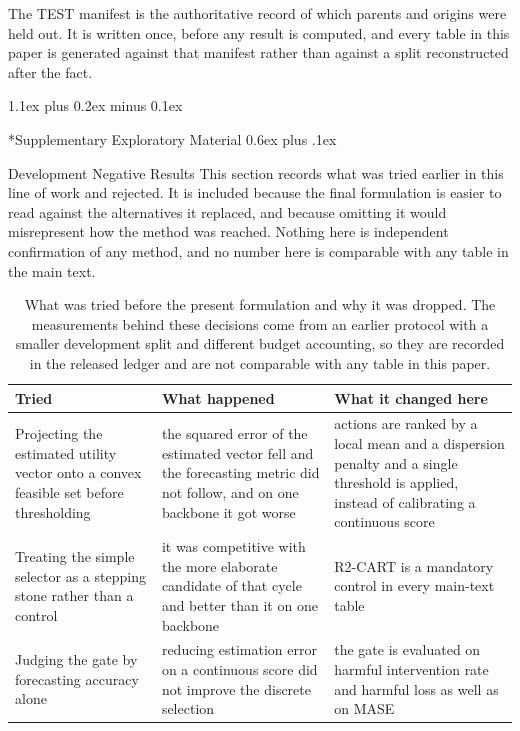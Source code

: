 \documentclass{article}
\makeatletter
\def\section{\@startsection{section}{1}{\z@}{-1.6ex plus -0.5ex minus -.2ex}%
  {1.1ex plus 0.2ex minus 0.1ex}{\large\sc\raggedright}}
\def\subsection{\@startsection{subsection}{2}{\z@}{-1.4ex plus -0.4ex minus -.2ex}%
  {0.6ex plus .1ex}{\normalsize\sc\raggedright}}
\makeatother
\begin{document}
The TEST manifest is the authoritative record of which parents and origins were held out. It
is written once, before any result is computed, and every table in this paper is generated
against that manifest rather than against a split reconstructed after the fact.

\section*{Supplementary Exploratory Material}
\label{app:supplementary}
\subsection{Development Negative Results}
\label{app:development}
This section records what was tried earlier in this line of work and rejected. It is included
because the final formulation is easier to read against the alternatives it replaced, and
because omitting it would misrepresent how the method was reached. Nothing here is independent
confirmation of any method, and no number here is comparable with any table in the main text.

\begin{table}[h]
  \caption{What was tried before the present formulation and why it was dropped. The
  measurements behind these decisions come from an earlier protocol with a smaller development
  split and different budget accounting, so they are recorded in the released ledger and are
  not comparable with any table in this paper.}
  \label{tab:app-development}
  \centering
  \small
  \setlength{\tabcolsep}{4pt}
\begin{tabular}{@{}p{} p{} p{}@{}}
    \toprule
    Tried & What happened & What it changed here \\
    \midrule
    Projecting the estimated utility vector onto a convex feasible set before thresholding & the squared error of the estimated vector fell and the forecasting metric did not follow, and on one backbone it got worse & actions are ranked by a local mean and a dispersion penalty and a single threshold is applied, instead of calibrating a continuous score \\
    Treating the simple selector as a stepping stone rather than a control & it was competitive with the more elaborate candidate of that cycle and better than it on one backbone & R2-CART is a mandatory control in every main-text table \\
    Judging the gate by forecasting accuracy alone & reducing estimation error on a continuous score did not improve the discrete selection & the gate is evaluated on harmful intervention rate and harmful loss as well as on MASE \\
    \bottomrule
  \end{tabular}
\end{table}
\end{document}
